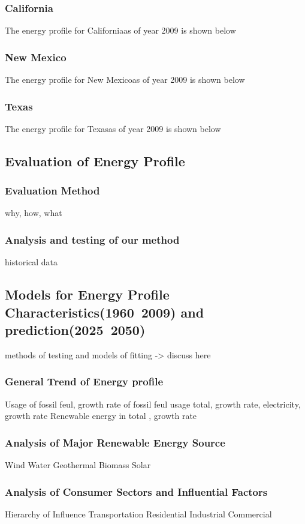 \documentclass{mcmthesis}
\def\ca{California}
\def\nm{New Mexico}
\def\tx{Texas}
\begin{document}
	\subsubsection{\ca}
		The energy profile for \ca as of year 2009 is shown below
	\subsubsection{\nm}
		The energy profile for \nm as of year 2009 is shown below
	\subsubsection{\tx}
		The energy profile for \tx as of year 2009 is shown below
		
\subsection{Evaluation of Energy Profile}
	\subsubsection{Evaluation Method}
		why, how, what
	\subsubsection{Analysis and testing of our method}
		historical data

\subsection{Models for Energy Profile Characteristics(1960~2009) and prediction(2025~2050)}
	methods of testing and models of fitting -> discuss here
	\subsubsection{General Trend of Energy profile}
		Usage of fossil feul, growth rate of fossil feul usage
		total, growth rate, 
		electricity, growth rate
		Renewable energy in total , growth rate			
	\subsubsection{Analysis of Major Renewable Energy Source}
		Wind
		Water
		Geothermal
		Biomass
		Solar
	\subsubsection{Analysis of Consumer Sectors and Influential Factors}	
		Hierarchy of Influence
		Transportation
		Residential
		Industrial
		Commercial
		
\end{document}
